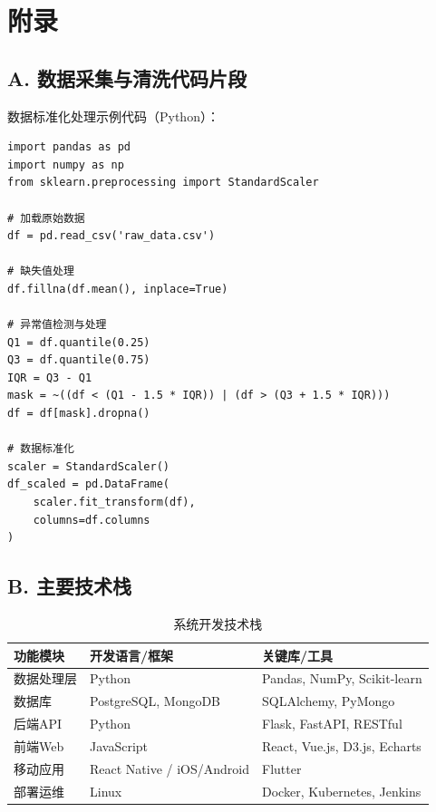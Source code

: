 
\makeatletter
\let\@oldaddcontentsline\addcontentsline
\renewcommand{\addcontentsline}[3]{}
\section*{附录}
\let\addcontentsline\@oldaddcontentsline
\makeatother

\subsection*{A. 数据采集与清洗代码片段}

数据标准化处理示例代码（Python）：

\begin{verbatim}
import pandas as pd
import numpy as np
from sklearn.preprocessing import StandardScaler

# 加载原始数据
df = pd.read_csv('raw_data.csv')

# 缺失值处理
df.fillna(df.mean(), inplace=True)

# 异常值检测与处理
Q1 = df.quantile(0.25)
Q3 = df.quantile(0.75)
IQR = Q3 - Q1
mask = ~((df < (Q1 - 1.5 * IQR)) | (df > (Q3 + 1.5 * IQR)))
df = df[mask].dropna()

# 数据标准化
scaler = StandardScaler()
df_scaled = pd.DataFrame(
    scaler.fit_transform(df),
    columns=df.columns
)
\end{verbatim}

\subsection*{B. 主要技术栈}

\begin{table}[H]
  \centering
  \caption{系统开发技术栈}
  \label{tab:tech_stack}
  \begin{tabularx}{\textwidth}{LLL}
    \toprule
    \textbf{功能模块} & \textbf{开发语言/框架} & \textbf{关键库/工具} \\
    \midrule
    数据处理层 & Python & Pandas, NumPy, Scikit-learn \\
    数据库 & PostgreSQL, MongoDB & SQLAlchemy, PyMongo \\
    后端API & Python & Flask, FastAPI, RESTful \\
    前端Web & JavaScript & React, Vue.js, D3.js, Echarts \\
    移动应用 & React Native / iOS/Android & Flutter \\
    部署运维 & Linux & Docker, Kubernetes, Jenkins \\
    \bottomrule
  \end{tabularx}
\end{table}

